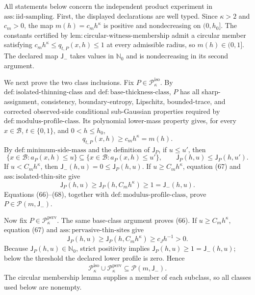 All statements below concern the independent product experiment in \(\mathrm{ass:iid\text{-}sampling}\). First, the displayed declarations are well typed. Since \(\kappa>2\) and \(c_m>0\), the map \(m(h)=c_mh^\kappa\) is positive and nondecreasing on \((0,h_0]\). The constants certified by \(\mathrm{lem:circular\text{-}witness\text{-}membership}\) admit a circular member satisfying \(c_mh^\kappa\le q_{t,P}(x,h)\le1\) at every admissible radius, so \(m(h)\in(0,1]\). The declared map \(\mathsf J_{-}\) takes values in \(\mathbb N_0\) and is nondecreasing in its second argument.

We next prove the two class inclusions. Fix \(P\in\mathcal P_\kappa^{\mathrm{iso}}\). By \(\mathrm{def:isolated\text{-}thinning\text{-}class}\) and \(\mathrm{def:base\text{-}thickness\text{-}class}\), \(P\) has all sharp-assignment, consistency, boundary-entropy, Lipschitz, bounded-trace, and corrected observed-side conditional sub-Gaussian properties required by \(\mathrm{def:modulus\text{-}profile\text{-}class}\). Its polynomial lower-mass property gives, for every \(x\in\mathcal B\), \(t\in\{0,1\}\), and \(0<h\le h_0\),
\[
 q_{t,P}(x,h)\ge c_mh^\kappa=m(h). \tag{66}
\]
By \(\mathrm{def:minimum\text{-}side\text{-}mass}\) and the definition of \(\mathsf J_P\), if \(u\le u'\), then
\[
 \{x\in\mathcal B:a_P(x,h)\le u\}
 \subseteq
 \{x\in\mathcal B:a_P(x,h)\le u'\},
 \qquad
 \mathsf J_P(h,u)\le\mathsf J_P(h,u'). \tag{67}
\]
If \(u<C_mh^\kappa\), then \(\mathsf J_{-}(h,u)=0\le\mathsf J_P(h,u)\). If \(u\ge C_mh^\kappa\), equation (67) and \(\mathrm{ass:isolated\text{-}thin\text{-}site}\) give
\[
 \mathsf J_P(h,u)
 \ge\mathsf J_P(h,C_mh^\kappa)
 \ge1
 =\mathsf J_{-}(h,u). \tag{68}
\]
Equations (66)--(68), together with \(\mathrm{def:modulus\text{-}profile\text{-}class}\), prove \(P\in\mathcal P(m,\mathsf J_{-})\).

Now fix \(P\in\mathcal P_\kappa^{\mathrm{perv}}\). The same base-class argument proves (66). If \(u\ge C_mh^\kappa\), equation (67) and \(\mathrm{ass:pervasive\text{-}thin\text{-}sites}\) give
\[
 \mathsf J_P(h,u)
 \ge\mathsf J_P(h,C_mh^\kappa)
 \ge c_Jh^{-1}>0.
\]
Because \(\mathsf J_P(h,u)\in\mathbb N_0\), strict positivity implies \(\mathsf J_P(h,u)\ge1=\mathsf J_{-}(h,u)\); below the threshold the declared lower profile is zero. Hence
\[
 \mathcal P_\kappa^{\mathrm{iso}}\cup
 \mathcal P_\kappa^{\mathrm{perv}}
 \subseteq\mathcal P(m,\mathsf J_{-}). \tag{69}
\]
The circular membership lemma supplies a member of each subclass, so all classes used below are nonempty.

